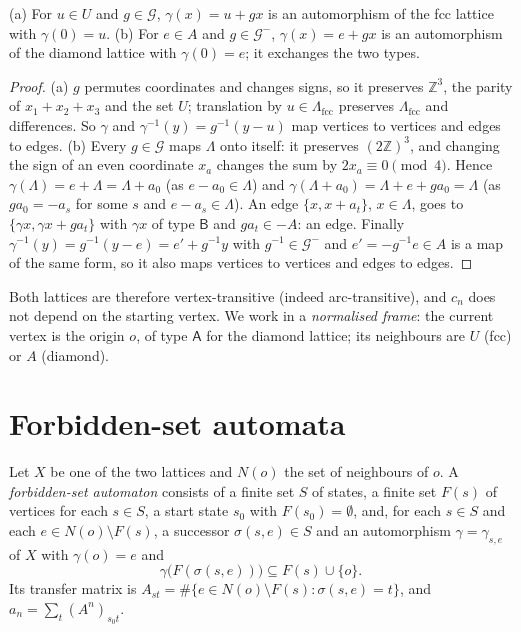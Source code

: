 \documentclass[11pt,a4paper]{report}
\newcommand*{\fcc}{\mathrm{fcc}}
\begin{document}
\begin{lemma}\label{lem:aut}
(a) For \(u\in U\) and \(g\in\mathcal G\), \(\gamma(x)=u+gx\) is an automorphism of the fcc lattice with
\(\gamma(0)=u\). (b) For \(e\in A\) and \(g\in\mathcal G^-\), \(\gamma(x)=e+gx\) is an automorphism of the diamond
lattice with \(\gamma(0)=e\); it exchanges the two types.
\end{lemma}
\begin{proof}
(a) \(g\) permutes coordinates and changes signs, so it preserves \(\mathbb Z^3\), the parity of \(x_1+x_2+x_3\) and
the set \(U\); translation by \(u\in\Lambda_\fcc\) preserves \(\Lambda_\fcc\) and differences. So \(\gamma\) and
\(\gamma^{-1}(y)=g^{-1}(y-u)\) map vertices to vertices and edges to edges.
(b) Every \(g\in\mathcal G\) maps \(\Lambda\) onto itself: it preserves \((2\mathbb Z)^3\), and changing the sign of an
even coordinate \(x_a\) changes the sum by \(2x_a\equiv0\pmod 4\). Hence \(\gamma(\Lambda)=e+\Lambda=\Lambda+a_0\) (as
\(e-a_0\in\Lambda\)) and \(\gamma(\Lambda+a_0)=\Lambda+e+ga_0=\Lambda\) (as \(ga_0=-a_s\) for some \(s\) and
\(e-a_s\in\Lambda\)). An edge \(\{x,x+a_t\}\), \(x\in\Lambda\), goes to \(\{\gamma x,\gamma x+ga_t\}\) with \(\gamma x\) of type
\(\mathsf B\) and \(ga_t\in-A\): an edge. Finally \(\gamma^{-1}(y)=g^{-1}(y-e)=e'+g^{-1}y\) with \(g^{-1}\in\mathcal G^-\)
and \(e'=-g^{-1}e\in A\) is a map of the same form, so it also maps vertices to vertices and edges to edges.
\end{proof}

Both lattices are therefore vertex-transitive (indeed arc-transitive), and \(c_n\) does not depend on the starting
vertex. We work in a \emph{normalised frame}: the current vertex is the origin \(o\), of type \(\mathsf A\) for the
diamond lattice; its neighbours are \(U\) (fcc) or \(A\) (diamond).

\section{Forbidden-set automata}\label{sec:automata}

\begin{definition}\label{def:auto}
Let \(X\) be one of the two lattices and \(N(o)\) the set of neighbours of \(o\). A \emph{forbidden-set automaton}
consists of a finite set \(S\) of states, a finite set \(F(s)\) of vertices for each \(s\in S\), a start state
\(s_0\) with \(F(s_0)=\emptyset\), and, for each \(s\in S\) and each \(e\in N(o)\setminus F(s)\), a successor
\(\sigma(s,e)\in S\) and an automorphism \(\gamma=\gamma_{s,e}\) of \(X\) with \(\gamma(o)=e\) and
\begin{equation}\label{eq:incl}
\gamma\bigl(F(\sigma(s,e))\bigr)\subseteq F(s)\cup\{o\}.
\end{equation}
Its transfer matrix is \(A_{st}=\#\{e\in N(o)\setminus F(s):\sigma(s,e)=t\}\), and \(a_n=\sum_t(A^n)_{s_0t}\).
\end{definition}
\end{document}
